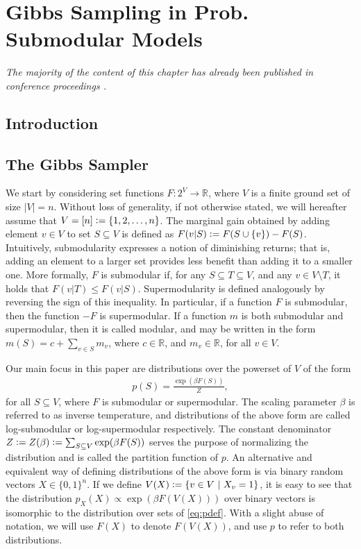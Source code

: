 \chapter{Gibbs Sampling in Prob. Submodular Models} \label{ch:gibbs}

\emph{The majority of the content of this chapter has already been published in conference proceedings \citep{gotovos15}.}

\section{Introduction}


\section{The Gibbs Sampler} \label{sect:setup}
We start by considering set functions $F : 2^V \to \mathbb{R}$, where $V$ is a finite ground set of size $|V| = n$.
Without loss of generality, if not otherwise stated, we will hereafter assume that $V = [n] \vcentcolon= \{1, 2, \ldots,n\}$.
The marginal gain obtained by adding element $v \in V$ to set $S \subseteq V$ is defined as $F(v|S) \vcentcolon= F(S \cup \{v\}) - F(S)$.
Intuitively, submodularity expresses a notion of diminishing returns; that is, adding an element to a larger set provides less benefit than adding it to a smaller one.
More formally, $F$ is submodular if, for any $S \subseteq T \subseteq V$, and any $v \in V \setminus T$, it holds that $F(v|T) \leq F(v|S)$.
Supermodularity is defined analogously by reversing the sign of this inequality.
In particular, if a function $F$ is submodular, then the function $-F$ is supermodular.
If a function $m$ is both submodular and supermodular, then it is called modular, and may be written in the form $m(S) = c + \sum_{v \in S} m_v$, where $c \in \mathbb{R}$, and $m_v \in \mathbb{R}$, for all $v \in V$.

Our main focus in this paper are distributions over the powerset of $V$ of the form
\begin{align}\label{eq:pdef}
p(S) = \frac{\exp(\beta F(S))}{Z},
\end{align}
for all $S \subseteq V$, where $F$ is submodular or supermodular.
The scaling parameter $\beta$ is referred to as inverse temperature, and distributions of the above form are called log-submodular or log-supermodular respectively.
The constant denominator $Z \vcentcolon= Z(\beta) \vcentcolon= \sum_{S \subseteq V} \exp(\beta F(S))$ serves the purpose of normalizing the distribution and is called the partition function of $p$.
An alternative and equivalent way of defining distributions of the above form is via binary random vectors $X \in \{0, 1\}^n$.
If we define $V(X) \vcentcolon= \left\{v \in V\ \middle\vert\  X_v = 1\right\}$, it is easy to see that the distribution $p_X(X) \propto \exp(\beta F(V(X)))$ over binary vectors is isomorphic to the distribution over sets of \eqref{eq:pdef}.
With a slight abuse of notation, we will use $F(X)$ to denote $F(V(X))$, and use $p$ to refer to both distributions.

